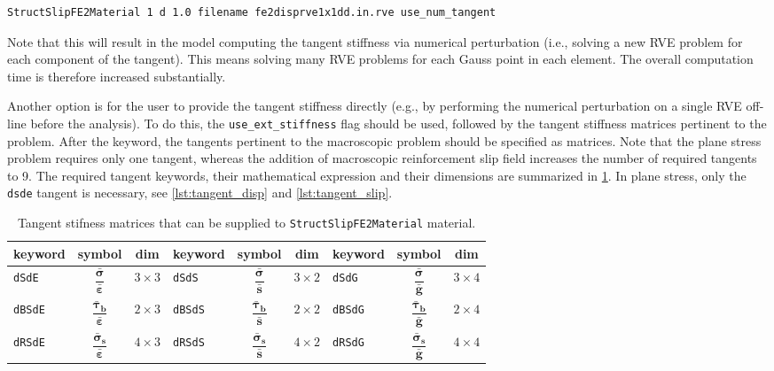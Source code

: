 \documentclass[11pt]{article}
\newcommand{\param}[1]{\texttt{#1}}
\begin{document}
\begin{lstlisting}[style=oofem, language=oofeminput]
StructSlipFE2Material 1 d 1.0 filename fe2disprve1x1dd.in.rve use_num_tangent
\end{lstlisting}
Note that this will result in the model computing the tangent stiffness via numerical perturbation (i.e., solving a new RVE problem for each component of the tangent). This means solving many RVE problems for each Gauss point in each element. 
The overall computation time is therefore increased substantially.

Another option is for the user to provide the tangent stiffness directly (e.g., by performing the numerical perturbation on a single RVE off-line before the analysis). To do this, the \param{use\_ext\_stiffness} flag should be used, followed by the tangent stiffness matrices pertinent to the problem.
After the keyword, the tangents pertinent to the macroscopic problem should be specified as matrices.
Note that the plane stress problem requires only one tangent, whereas the addition of macroscopic reinforcement slip field increases the number of required tangents to 9.
The required tangent keywords, their mathematical expression and their dimensions are summarized in \cref{tab:tangents}. In plane stress, only the \param{dsde} tangent is necessary, see \cref{lst:tangent_disp} and \ref{lst:tangent_slip}.

\begin{table}[H]
    \renewcommand*{\arraystretch}{3}
    \caption{Tangent stifness matrices that can be supplied to \param{StructSlipFE2Material} material.}
    \centering
    \begin{tabular}{|l|c|c|l|c|c|l|c|c|}
        \hline
    keyword & symbol & dim &  keyword  & symbol & dim &  keyword & symbol & dim \\ \hline
    \param{dSdE}  & $\dfrac{\bm{\bar{\sigma}}}{\bm{\bar{\varepsilon}}}$ & $3\times3$  & \param{dSdS} & $\dfrac{\bm{\bar{\sigma}}}{\bm{\bar{s}}}$ & $3\times2$  & \param{dSdG} & $\dfrac{\bm{\bar{\sigma}}}{\bm{\bar{g}}}$ & $3\times4$  \\ \hline
    \param{dBSdE} & $\dfrac{\bm{\bar{\tau}_b}}{\bm{\bar{\varepsilon}}}$ & $2\times3$  & \param{dBSdS} & $\dfrac{\bm{\bar{\tau}_b}}{\bm{\bar{s}}}$ & $2\times2$  & \param{dBSdG} & $\dfrac{\bm{\bar{\tau}_b}}{\bm{\bar{g}}}$ & $2\times4$  \\ \hline
    \param{dRSdE} & $\dfrac{\bm{\bar{\sigma}_s}}{\bm{\bar{\varepsilon}}}$ & $4\times3$  & \param{dRSdS} & $\dfrac{\bm{\bar{\sigma}_s}}{\bm{\bar{s}}}$ & $4\times2$  & \param{dRSdG} &  $\dfrac{\bm{\bar{\sigma}_s}}{\bm{\bar{g}}}$ & $4\times4$ \\ \hline
    \end{tabular}
    \label{tab:tangents}
\end{table}
\end{document}
